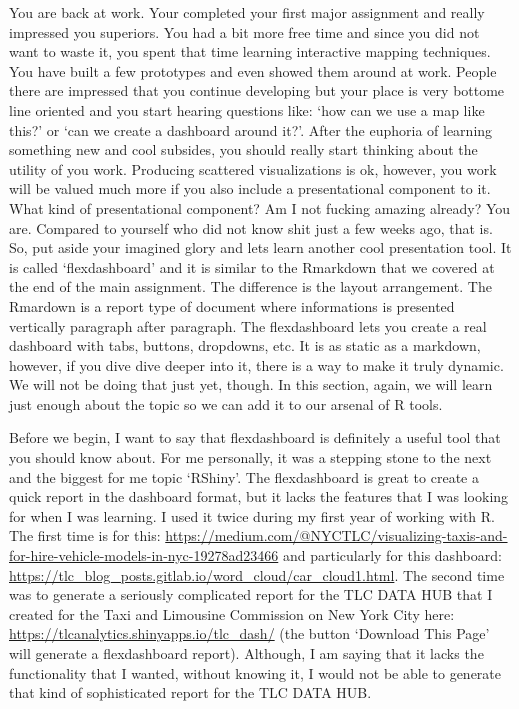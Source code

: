 \documentclass[]{book}
\begin{document}
You are back at work. Your completed your first major assignment and really impressed you superiors. You had a bit more free time and since you did not want to waste it, you spent that time learning interactive mapping techniques. You have built a few prototypes and even showed them around at work. People there are impressed that you continue developing but your place is very bottome line oriented and you start hearing questions like: `how can we use a map like this?' or `can we create a dashboard around it?'. After the euphoria of learning something new and cool subsides, you should really start thinking about the utility of you work. Producing scattered visualizations is ok, however, you work will be valued much more if you also include a presentational component to it. What kind of presentational component? Am I not fucking amazing already? You are. Compared to yourself who did not know shit just a few weeks ago, that is. So, put aside your imagined glory and lets learn another cool presentation tool. It is called `flexdashboard' and it is similar to the Rmarkdown that we covered at the end of the main assignment. The difference is the layout arrangement. The Rmardown is a report type of document where informations is presented vertically paragraph after paragraph. The flexdashboard lets you create a real dashboard with tabs, buttons, dropdowns, etc. It is as static as a markdown, however, if you dive dive deeper into it, there is a way to make it truly dynamic. We will not be doing that just yet, though. In this section, again, we will learn just enough about the topic so we can add it to our arsenal of R tools.

Before we begin, I want to say that flexdashboard is definitely a useful tool that you should know about. For me personally, it was a stepping stone to the next and the biggest for me topic `RShiny'. The flexdashboard is great to create a quick report in the dashboard format, but it lacks the features that I was looking for when I was learning. I used it twice during my first year of working with R. The first time is for this: \url{https://medium.com/@NYCTLC/visualizing-taxis-and-for-hire-vehicle-models-in-nyc-19278ad23466} and particularly for this dashboard: \url{https://tlc_blog_posts.gitlab.io/word_cloud/car_cloud1.html}. The second time was to generate a seriously complicated report for the TLC DATA HUB that I created for the Taxi and Limousine Commission on New York City here: \url{https://tlcanalytics.shinyapps.io/tlc_dash/} (the button `Download This Page' will generate a flexdashboard report). Although, I am saying that it lacks the functionality that I wanted, without knowing it, I would not be able to generate that kind of sophisticated report for the TLC DATA HUB.
\end{document}
